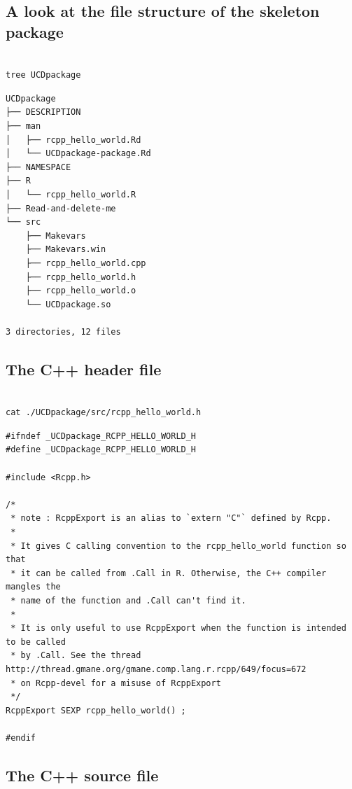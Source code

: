 \documentclass[11pt]{article}
\begin{document}
\subsection{A look at the file structure of the skeleton package}
\label{sec-8-2}



\begin{verbatim}

tree UCDpackage
\end{verbatim}


\begin{verbatim}
UCDpackage
├── DESCRIPTION
├── man
│   ├── rcpp_hello_world.Rd
│   └── UCDpackage-package.Rd
├── NAMESPACE
├── R
│   └── rcpp_hello_world.R
├── Read-and-delete-me
└── src
    ├── Makevars
    ├── Makevars.win
    ├── rcpp_hello_world.cpp
    ├── rcpp_hello_world.h
    ├── rcpp_hello_world.o
    └── UCDpackage.so

3 directories, 12 files
\end{verbatim}
\subsection{The C++ header file}
\label{sec-8-3}



\begin{verbatim}

cat ./UCDpackage/src/rcpp_hello_world.h
\end{verbatim}


\begin{verbatim}
#ifndef _UCDpackage_RCPP_HELLO_WORLD_H
#define _UCDpackage_RCPP_HELLO_WORLD_H

#include <Rcpp.h>

/*
 * note : RcppExport is an alias to `extern "C"` defined by Rcpp.
 *
 * It gives C calling convention to the rcpp_hello_world function so that 
 * it can be called from .Call in R. Otherwise, the C++ compiler mangles the 
 * name of the function and .Call can't find it.
 *
 * It is only useful to use RcppExport when the function is intended to be called
 * by .Call. See the thread http://thread.gmane.org/gmane.comp.lang.r.rcpp/649/focus=672
 * on Rcpp-devel for a misuse of RcppExport
 */
RcppExport SEXP rcpp_hello_world() ;

#endif
\end{verbatim}
\subsection{The C++ source file}
\label{sec-8-4}
\end{document}
